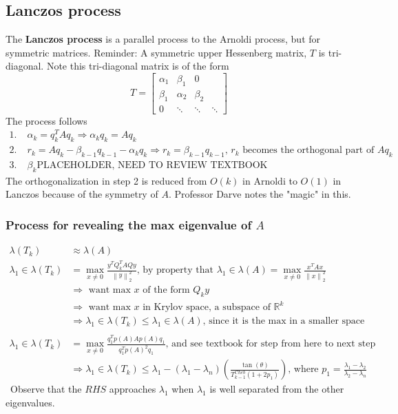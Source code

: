 \documentclass{article}
\newcommand{\norm}[2]{\left\lVert#1\right\rVert_#2}
\begin{document}
\subsection{Lanczos process}
The \textbf{Lanczos process} is a parallel process to the Arnoldi process, but for symmetric matrices. Reminder: A symmetric upper Hessenberg matrix, $T$ is tri-diagonal. Note this tri-diagonal matrix is of the form
\begin{equation*}
    T = \begin{bmatrix}
        \alpha_1 & \beta_1 & 0\\
        \beta_1 & \alpha_2 & \beta_2 \\
        0 & \ddots & \ddots & \ddots
    \end{bmatrix}
\end{equation*}
The process follows
\begin{align*}
    1. \;& \alpha_k = q_k^TAq_k \Longrightarrow \alpha_kq_k = Aq_k\\
    2. \;& r_k = Aq_k - \beta_{k-1}q_{k-1} - \alpha_kq_k \Longrightarrow r_k = \beta_{k-1}q_{k-1} \textrm{, $r_k$ becomes the orthogonal part of $Aq_k$}\\
    3. \;& \beta_k \textrm{PLACEHOLDER, NEED TO REVIEW TEXTBOOK}
\end{align*}
The orthogonalization in step 2 is reduced from $O(k)$ in Arnoldi to $O(1)$ in Lanczos because of the symmetry of $A$. Professor Darve notes the "magic" in this. 

\subsubsection{Process for revealing the max eigenvalue of $A$}
\begin{align*}
    \lambda(T_k) &\approx \lambda(A)\\
    \lambda_1 \in \lambda(T_k) &= \max_{x \neq 0} \frac{y^TQ_k^TAQy}{\norm{y}{2}^2} \textrm{, by property that } \lambda_1 \in \lambda(A) = \max_{x \neq 0} \frac{x^TAx}{\norm{x}{2}^2}\\
    &\Longrightarrow \textrm{ want max $x$ of the form } Q_ky \\
    &\Longrightarrow \textrm{ want max $x$ in Krylov space, a subspace of } \mathbb{R}^k\\
    &\Longrightarrow \lambda_1 \in \lambda(T_k) \leq \lambda_1 \in \lambda(A) \textrm{, since it is the max in a smaller space} \\ \\
    \lambda_1 \in \lambda(T_k) &= \max_{x \neq 0} \frac{q_1^Tp(A)Ap(A)q_1}{q_1^Tp(A)^2q_1} \textrm{, and see textbook for step from here to next step}\\
    &\Longrightarrow \lambda_1 \in \lambda(T_k) \leq \lambda_1 - (\lambda_1-\lambda_n)(\frac{\tan(\theta)}{T_{k-1}^{Cheb}(1+2p_1)}) \textrm{, where } p_1 = \frac{\lambda_1 - \lambda_2}{\lambda_2 - \lambda_n}
\end{align*}\
Observe that the $RHS$ approaches $\lambda_1$ when $\lambda_1$ is well separated from the other eigenvalues. 
\end{document}
